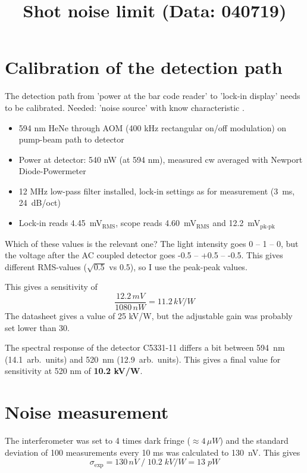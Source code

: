 \documentclass[12pt,a4paper]{article}
\title{Shot noise limit (Data: 040719) }
\begin{document}
\maketitle

\section{Calibration of the detection path}

The detection path from 'power at the bar code reader' to 'lock-in display' needs to be calibrated. Needed: 'noise source' with know characteristic .

\begin{itemize}
  \item 594 nm HeNe through AOM (400 kHz rectangular on/off modulation) on pump-beam path to detector
  \item Power at detector: 540 nW (at 594 nm), measured cw averaged with Newport Diode-Powermeter
  \item 12 MHz low-pass filter installed, lock-in settings as for measurement (3~ms, 24~dB/oct)
  \item Lock-in reads 4.45~mV$_{\text{RMS}}$, scope reads 4.60~mV$_{\text{RMS}}$ and 12.2~mV$_{\text{pk-pk}}$
\end{itemize}

Which of these values is the relevant one? The light intensity goes 0 -- 1 -- 0, but the voltage after the AC coupled detector goes -0.5 -- +0.5 -- -0.5. This gives different RMS-values ($\sqrt{0.5}$ vs 0.5), so I use the peak-peak values.

This gives a sensitivity of 
\[
     \frac{12.2 \, mV}{1080 \, nW} = 11.2\, kV/W \]
The datasheet gives a value of 25  kV/W, but the adjustable gain was probably set lower than 30.

The spectral response of the detector C5331-11 differs a bit between  594~nm (14.1~arb.~units) and  520~nm (12.9~arb.~units). This gives a final value for sensitivity at 520 nm of \textbf{10.2 kV/W}. 



\section{Noise measurement}

The interferometer was set to 4 times dark fringe ($\approx 4 \, \mu W$) and the standard deviation of 100 measurements every 10 ms was calculated to 130~nV. This gives
\[
  \sigma_{\text{exp}} = 130 \, nV \; / \; 10.2 \; kV/W = 13 \; pW \]
 
\end{document}
